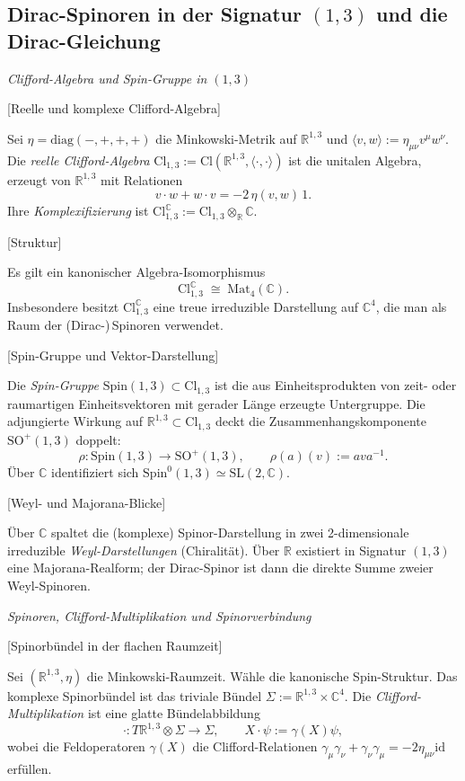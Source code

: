\documentclass[10pt, letterpaper]{article}
\newcommand{\R}{\mathbb{R}}
\newcommand{\C}{\mathbb{C}}
\newcommand{\Cl}{\mathrm{Cl}}
\newcommand{\Mat}{\mathrm{Mat}}
\newcommand{\SL}{\mathrm{SL}}
\newcommand{\SO}{\mathrm{SO}}
\newcommand{\Spin}{\mathrm{Spin}}
\begin{document}
\subsection{Dirac-Spinoren in der Signatur $(1,3)$ und die Dirac-Gleichung}

\emph{Clifford-Algebra und Spin-Gruppe in $(1,3)$}


[Reelle und komplexe Clifford-Algebra]

Sei $\eta = \mathrm{diag}(-,+,+,+)$ die Minkowski-Metrik auf $\R^{1,3}$ und $\langle v,w\rangle:=\eta_{\mu\nu} v^\mu w^\nu$. 
Die \emph{reelle Clifford-Algebra} $\Cl_{1,3}:=\Cl(\R^{1,3},\langle\cdot,\cdot\rangle)$ ist die unitalen Algebra, erzeugt von $\R^{1,3}$ mit Relationen
\[
v\cdot w + w\cdot v = -2\,\eta(v,w)\,1.
\]
Ihre \emph{Komplexifizierung} ist $\Cl_{1,3}^{\C}:=\Cl_{1,3}\otimes_\R \C$.




[Struktur]

Es gilt ein kanonischer Algebra-Isomorphismus 
\[
\Cl_{1,3}^{\C}\;\cong\; \Mat_{4}(\C).
\]
Insbesondere besitzt $\Cl_{1,3}^{\C}$ eine treue irreduzible Darstellung auf $\C^4$, die man als Raum der (Dirac-)\,Spinoren verwendet.



[Spin-Gruppe und Vektor-Darstellung]

Die \emph{Spin-Gruppe} $\Spin(1,3)\subset \Cl_{1,3}$ ist die aus Einheitsprodukten von zeit- oder raumartigen Einheitsvektoren mit gerader Länge erzeugte Untergruppe. Die adjungierte Wirkung auf $\R^{1,3}\subset \Cl_{1,3}$ deckt die Zusammenhangskomponente $\SO^+(1,3)$ doppelt: 
\[
\rho:\Spin(1,3)\to \SO^+(1,3),\qquad \rho(a)(v):=a v a^{-1}.
\]
Über $\C$ identifiziert sich $\Spin^0(1,3)\simeq \SL(2,\C)$.




[Weyl- und Majorana-Blicke]

Über $\C$ spaltet die (komplexe) Spinor-Darstellung in zwei 2-dimensionale irreduzible \emph{Weyl-Darstellungen} (Chiralität). Über $\R$ existiert in Signatur $(1,3)$ eine Majorana-Realform; der Dirac-Spinor ist dann die direkte Summe zweier Weyl-Spinoren.


\emph{Spinoren, Clifford-Multiplikation und Spinorverbindung}


[Spinorbündel in der flachen Raumzeit]

Sei $(\R^{1,3},\eta)$ die Minkowski-Raumzeit. Wähle die kanonische Spin-Struktur. Das komplexe Spinorbündel ist das triviale Bündel 
\(\Sigma := \R^{1,3}\times \C^4\).
Die \emph{Clifford-Multiplikation} ist eine glatte Bündelabbildung
\[
\cdot: T\R^{1,3}\otimes \Sigma \to \Sigma,\qquad X\cdot\psi := \gamma(X)\psi,
\]
wobei die Feldoperatoren $\gamma(X)$ die Clifford-Relationen
\(\gamma_\mu\gamma_\nu+\gamma_\nu\gamma_\mu=-2\eta_{\mu\nu}\mathrm{id}\)
erfüllen.
\end{document}
